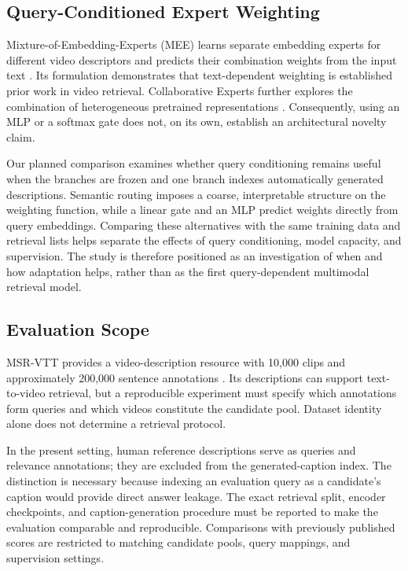 \subsection{Query-Conditioned Expert Weighting}

Mixture-of-Embedding-Experts (MEE) learns separate embedding experts for different video descriptors and predicts their combination weights from the input text \cite{miech2018mee}. Its formulation demonstrates that text-dependent weighting is established prior work in video retrieval. Collaborative Experts further explores the combination of heterogeneous pretrained representations \cite{liu2019experts}. Consequently, using an MLP or a softmax gate does not, on its own, establish an architectural novelty claim.

Our planned comparison examines whether query conditioning remains useful when the branches are frozen and one branch indexes automatically generated descriptions. Semantic routing imposes a coarse, interpretable structure on the weighting function, while a linear gate and an MLP predict weights directly from query embeddings. Comparing these alternatives with the same training data and retrieval lists helps separate the effects of query conditioning, model capacity, and supervision. The study is therefore positioned as an investigation of when and how adaptation helps, rather than as the first query-dependent multimodal retrieval model.

\subsection{Evaluation Scope}

MSR-VTT provides a video-description resource with 10,000 clips and approximately 200,000 sentence annotations \cite{xu2016msrvtt}. Its descriptions can support text-to-video retrieval, but a reproducible experiment must specify which annotations form queries and which videos constitute the candidate pool. Dataset identity alone does not determine a retrieval protocol.

In the present setting, human reference descriptions serve as queries and relevance annotations; they are excluded from the generated-caption index. The distinction is necessary because indexing an evaluation query as a candidate's caption would provide direct answer leakage. The exact retrieval split, encoder checkpoints, and caption-generation procedure must be reported to make the evaluation comparable and reproducible. Comparisons with previously published scores are restricted to matching candidate pools, query mappings, and supervision settings.

